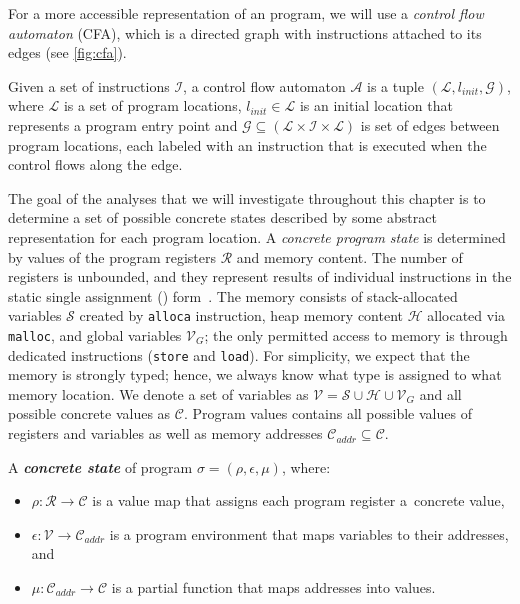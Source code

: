 For a more accessible representation of an \llvm program, we will use a
\emph{control flow automaton} (CFA), which is a directed graph with \llvm
instructions attached to its edges (see \autoref{fig:cfa}).

\begin{definition}
    Given a set of instructions $\mathcal{I}$, a control flow automaton
    $\mathcal{A}$ is a tuple $(\mathcal{L}, l_{\textit{init}}, \mathcal{G})$,
    where $\mathcal{L}$ is a set of program locations, $l_{\textit{init}} \in
    \mathcal{L}$ is an initial location that represents a program entry point
    and $\mathcal{G} \subseteq (\mathcal{L} \times \mathcal{I} \times
    \mathcal{L})$ is set of edges between program locations, each labeled with
    an instruction that is executed when the control flows along the edge.
\end{definition}

The goal of the analyses that we will investigate throughout this chapter is to
determine a set of possible concrete states described
by some abstract representation for each program location. A \emph{concrete
program state} is determined by values of the program registers $\mathcal{R}$
and memory content. The number of \llvm registers is unbounded, and they
represent results of individual instructions in the static single assignment
(\ssa) form~\cite{Cytron1991}. The memory consists of stack-allocated variables
$\mathcal{S}$ created by \texttt{alloca} instruction, heap memory content
$\mathcal{H}$ allocated via \texttt{malloc}, and global variables
$\mathcal{V}_{\textit{G}}$; the only permitted access to memory is through
dedicated instructions (\texttt{store} and \texttt{load}).  For simplicity, we
expect that the memory is strongly typed; hence, we always know what type is
assigned to what memory location.  We denote a set of variables as $\mathcal{V}
= \mathcal{S} \cup \mathcal{H} \cup \mathcal{V}_{\textit{G}}$ and all possible
concrete values as $\mathcal{C}$.  Program values contains all possible values
of registers and variables as well as memory addresses
$\mathcal{C}_{\textit{addr}} \subseteq \mathcal{C}$.

\begin{definition}
    A \textbf{\emph{concrete state}} of \llvm program $\sigma = (\rho, \epsilon, \mu)$, where:
\begin{itemize}
    \item $\rho \colon \mathcal{R} \to \mathcal{C}$ is a value map that assigns each program
        register a~concrete value,
    \item $\epsilon \colon \mathcal{V} \to \mathcal{C}_{\textit{addr}}$ is a
        program environment that maps variables to their addresses, and
    \item $\mu \colon \mathcal{C}_{\textit{addr}} \to \mathcal{C}$ is a
        partial function that maps addresses into values.
\end{itemize}
\end{definition}

